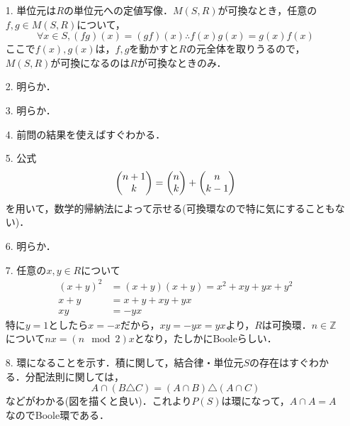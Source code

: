\documentclass[a4paper,10pt,uplatex]{jsarticle}
\newcommand{\Z}{\mathbb{Z}}
\numberwithin{equation}{section}
\theoremstyle{mystyle}
\begin{document}
\begin{itemize}
    \item[1.] 単位元は$R$の単位元への定値写像．$M(S,R)$が可換なとき，任意の$f,g \in M(S,R)$について，
    \begin{equation}
        \forall x \in S, (fg)(x) = (gf)(x) \therefore f(x)g(x) = g(x)f(x)
    \end{equation}
    ここで$f(x),g(x)$は，$f,g$を動かすと$R$の元全体を取りうるので，$M(S,R)$が可換になるのは$R$が可換なときのみ．

    \item[2.] 明らか．
    \item[3.] 明らか．
    \item[4.] 前問の結果を使えばすぐわかる．
    \item[5.] 公式
    \begin{equation}
        \mqty(n+1\\k) = \mqty(n\\k) + \mqty(n\\k-1)
    \end{equation}
    を用いて，数学的帰納法によって示せる(可換環なので特に気にすることもない)．
    \item[6.] 明らか．
    \item[7.] 任意の$x,y \in R$について
    \begin{align}
        (x + y)^2 &= (x + y)(x + y) = x^2 + xy + yx + y^2 \\
        x + y &= x + y + xy + yx \\
        xy &= -yx
    \end{align}
    特に$y = 1$としたら$x = -x$だから，$xy = -yx = yx$より，$R$は可換環．$n \in \Z$について$nx = (n \mod 2)x$となり，たしかにBooleらしい．
    \item [8.] 環になることを示す．積に関して，結合律・単位元$S$の存在はすぐわかる．分配法則に関しては，
    \begin{equation}
        A \cap (B \triangle C) = (A \cap B) \triangle (A \cap C)
    \end{equation}
    などがわかる(図を描くと良い)．これより$P(S)$は環になって，$A \cap A = A$なのでBoole環である．
\end{itemize}
\end{document}
